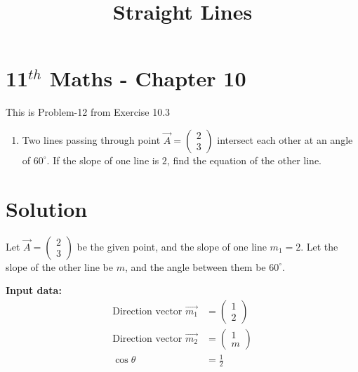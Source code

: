 \documentclass[12pt]{article}
\begin{document}
\title{\textbf{Straight Lines}}
\date{\vspace{-5ex}}
\maketitle

\section*{11$^{th}$ Maths - Chapter 10}
This is Problem-12 from Exercise 10.3

\begin{enumerate}
\item Two lines passing through point $\vec{A} = \begin{pmatrix} 2 \\ 3 \end{pmatrix}$ intersect each other at an angle of $60^\circ$. If the slope of one line is $2$, find the equation of the other line.
\end{enumerate}

\section{Solution}

Let $\vec{A} = \begin{pmatrix} 2 \\ 3 \end{pmatrix}$ be the given point, and the slope of one line $m_1 = 2$. Let the slope of the other line be $m$, and the angle between them be $60^\circ$.

\textbf{Input data:}
\begin{align*}
\text{Direction vector } \vec{m_1} &= \begin{pmatrix} 1 \\ 2 \end{pmatrix} \\
\text{Direction vector } \vec{m_2} &= \begin{pmatrix} 1 \\ m \end{pmatrix} \\
\cos \theta &= \frac{1}{2}
\end{align*}
\end{document}
